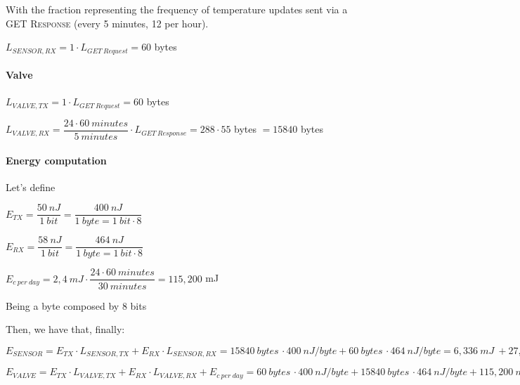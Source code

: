 \documentclass[a4paper,11pt]{article} %
\begin{document}
    \medskip

    With the fraction representing the frequency of temperature updates sent via a \textsc{GET Response} (every 5 minutes, 12 per hour).

    \smallskip

    $L_{SENSOR, RX} = 1 \cdot L_{GET\ Request} = 60$ bytes

    \paragraph{Valve}

    $L_{VALVE, TX} = 1 \cdot L_{GET\ Request} = 60$ bytes

    \medskip

    $L_{VALVE, RX} = \dfrac{24 \cdot 60\ minutes}{5\ minutes} \cdot L_{GET\ Response} = 288 \cdot 55$ bytes $ = 15840$ bytes

    \paragraph{Energy computation}

    Let's define

    \bigskip

    $E_{TX} = \dfrac{50\ nJ}{1\ bit} = \dfrac{400\ nJ}{1\ byte = 1\ bit \cdot 8}$

    \medskip

    $E_{RX} = \dfrac{58\ nJ}{1\ bit} = \dfrac{464\ nJ}{1\ byte = 1\ bit \cdot 8}$

    \medskip

    $E_{c \ per \ day} = 2,4\ mJ \cdot \dfrac{24 \cdot 60\ minutes}{30\ minutes} = 115,200$ mJ

    \bigskip

    Being a byte composed by 8 bits

    \smallskip

    Then, we have that, finally:

    \medskip

    $E_{SENSOR} = E_{TX} \cdot L_{SENSOR, TX} + E_{RX} \cdot L_{SENSOR, RX} = 15840\ bytes \, \cdot 400\ nJ/byte + 60\ bytes \, \cdot 464\ nJ/byte = 6,336\ mJ\ + 27,840\ \mu J = 6,364\ mJ$

    \medskip

    $E_{VALVE} = E_{TX} \cdot L_{VALVE, TX} + E_{RX} \cdot L_{VALVE, RX} + E_{c \ per \ day} = 60\ bytes \, \cdot 400\ nJ/byte + 15840\ bytes \, \cdot 464\ nJ/byte + 115,200\ mJ = 24,000\ \mu J + 7,350\ mJ + 115,200\ mJ = 122,574\ mJ$
\end{document}
